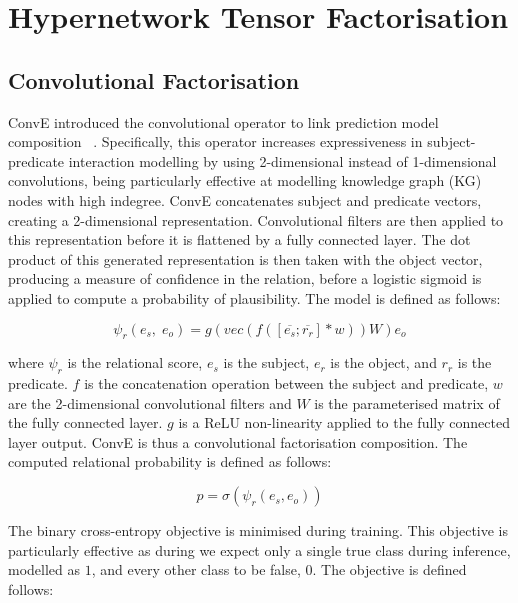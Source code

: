
\section{Hypernetwork Tensor Factorisation}

\subsection{Convolutional Factorisation}
ConvE introduced the convolutional operator to link prediction model composition ~\citep{dettmers2018convolutional}. Specifically, this operator increases expressiveness in subject-predicate interaction modelling by using 2-dimensional instead of 1-dimensional convolutions, being particularly effective at modelling knowledge graph (KG) nodes with high indegree. ConvE concatenates subject and predicate vectors, creating a 2-dimensional representation. Convolutional filters are then applied to this representation before it is flattened by a fully connected layer. The dot product of this generated representation is then taken with the object vector, producing a measure of confidence in the relation, before a logistic sigmoid is applied to compute a probability of plausibility. The model is defined as follows:

\begin{equation}
	\psi_r(e_s, \; e_o) = g(vec(f(\left [ \overline{e_s}; \overline{r_r} \right ]*w))W)e_o
\end{equation}

where $\psi_r$ is the relational score, $e_s$ is the subject, $e_r$ is the object, and $r_r$ is the predicate. $f$ is the concatenation operation between the subject and predicate, $w$ are the 2-dimensional convolutional filters and $W$ is the parameterised matrix of the fully connected layer. $g$ is a ReLU non-linearity applied to the fully connected layer output. ConvE is thus a convolutional factorisation composition. The computed relational probability is defined as follows: 

\begin{equation}
	p = \sigma(\psi_r(e_s,e_o)) 
\end{equation}

The binary cross-entropy objective is minimised during training. This objective is particularly effective as during we expect only a single true class during inference, modelled as $1$, and every other class to be false, $0$. The objective is defined follows:

